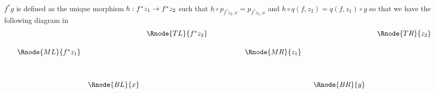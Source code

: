 $f^*g$ is defined
as the unique morphism $h:f^*z_1 \rightarrow f^*z_2$ such that
$h \circ p_{f^*z_2,x} = p_{f^*z_1,x}$ and $h \circ q(f,z_2) = q(f,z_1)\circ g$
so that we have the following diagram in \catc
$$
\begin{array}{cccp{.9cm}ccc}
                   &               &\Rnode{TL}{f^*z_2} & &                &                & \ \ \Rnode{TR}{z_2}\ \\ [0.5cm]
\Rnode{ML}{f^*z_1} &               &                   & &\ \ \Rnode{MR}{z_1}\ \ &                &               \\ [1.2cm]
                   & \Rnode{BL}{x} &                   & &                & \Rnode{BR}{y}  &
\end{array}
$$

\newcommand{\lhsdom}{(f^*g)^*(f^*z_1)}
\newcommand{\lhscod}{(f^*g)^*(f^*z_2)}
\newcommand{\lhs}{(f^*g)^*(f^*h)}
\newcommand{\fghdom}{f^*(g^*z_1)}
\newcommand{\fghcod}{f^*(g^*z_2)}
\newcommand{\fgh}{f^*(g^*h)}
\newcommand{\fhdom}{f^*z_1}
\newcommand{\fhcod}{f^*z_2}
\newcommand{\fh}{f^*h}
\newcommand{\ghdom}{g^*z_1}
\newcommand{\ghcod}{g^*z_2}
\newcommand{\gh}{g^*h}
\newcommand{\fgdom}{f^*y_1}
\newcommand{\fgcod}{f^*y_2}
\newcommand{\fg}{f^*g}
\newcommand{\fdom}{x_1}
\newcommand{\fcod}{x_2}
\newcommand{\f}{f}
\newcommand{\gdom}{y_1}
\newcommand{\gcod}{y_2}
\newcommand{\g}{g}
\newcommand{\hdom}{z_1}
\newcommand{\hcod}{z_2}
\newcommand{\h}{h}

